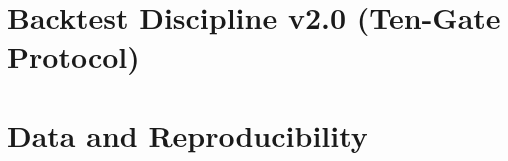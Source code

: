 \documentclass[11pt]{article}
\begin{document}
\appendix
\section{Backtest Discipline v2.0 (Ten-Gate Protocol)}


\section{Data and Reproducibility}

\end{document}
